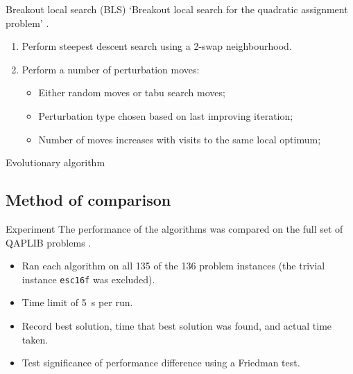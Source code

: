 {{        \begin{frame}{Breakout local search (BLS)}
            `Breakout local search for the quadratic assignment problem' \citep{Benlic:2013gi}.

            \begin{enumerate}
                \item Perform steepest descent search using a 2-swap neighbourhood.
                \item Perform a number of perturbation moves:
                    \begin{itemize}
                        \item Either random moves or tabu search moves;
                        \item Perturbation type chosen based on last improving iteration;
                        \item Number of moves increases with visits to the same local optimum;
                    \end{itemize}
            \end{enumerate}
        \end{frame}

        \begin{frame}{Evolutionary algorithm}

        \end{frame}
    }

    \subsection{Method of comparison} {
        \begin{frame}{Experiment}
            The performance of the algorithms was compared on the full set of QAPLIB problems \citep{Burkard:1997ve}.

            \begin{itemize}
                \item Ran each algorithm on all 135 of the 136 problem instances (the trivial instance \texttt{esc16f} was excluded).
                \item Time limit of \SI{5}{\second} per run.
                \item Record best solution, time that best solution was found, and actual time taken.
                \item Test significance of performance difference using a Friedman test.
            \end{itemize}
        \end{frame}
    }
}

